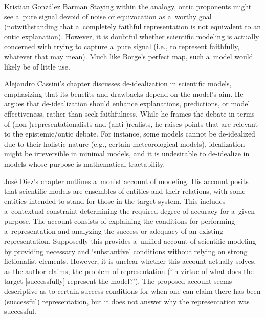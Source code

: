 \begin{recengenv}{Kristian González Barman}
Staying within the analogy, ontic proponents might see a~pure signal devoid of noise or equivocation as a~worthy goal (notwithstanding that a~completely faithful representation is not equivalent to an ontic explanation). However, it is doubtful whether scientific modeling is actually concerned with trying to capture a~pure signal (i.e., to represent faithfully, whatever that may mean). Much like Borge's perfect map, such a~model would likely be of little use.

Alejandro Cassini's chapter discusses de-idealization in scientific models, emphasizing that its benefits and drawbacks depend on the model's aim. He argues that de-idealization should enhance explanations, predictions, or model effectiveness, rather than seek faithfulness. While he frames the debate in terms of (non-)representationalists and (anti-)realists, he raises points that are relevant to the epistemic/ontic debate. For instance, some models cannot be de-idealized due to their holistic nature (e.g., certain meteorological models), idealization might be irreversible in minimal models, and it is undesirable to de-idealize in models whose purpose is mathematical tractability.

José Diez's chapter outlines a~monist account of modeling. His account posits that scientific models are ensembles of entities and their relations, with some entities intended to stand for those in the target system. This includes a~contextual constraint determining the required degree of accuracy for a~given purpose. The account consists of explaining the conditions for performing a~representation and analyzing the success or adequacy of an existing representation. Supposedly this provides a~unified account of scientific modeling by providing necessary and ‘substantive' conditions without relying on strong fictionalist elements. However, it is unclear whether this account actually solves, as the author claims, the problem of representation (‘in virtue of what does the target [successfully] represent the model?'). The proposed account seems descriptive as to certain success conditions for when one can claim there has been (successful) representation, but it does not answer why the representation was successful.


\end{recengenv}

